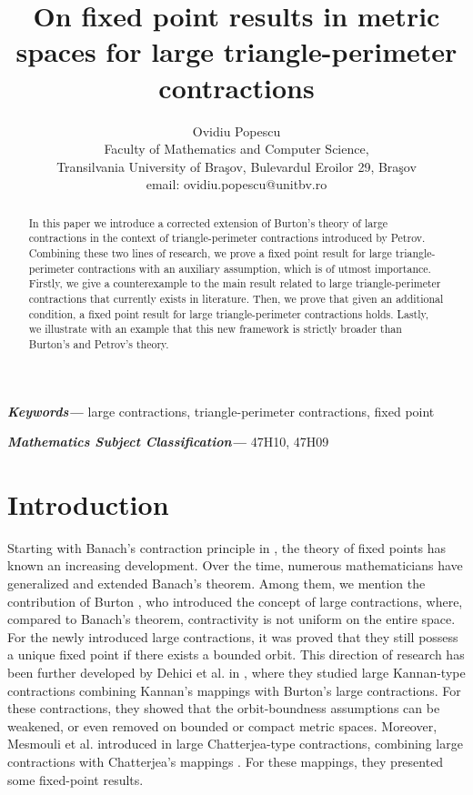 \documentclass[12 pt]{article}
\title{On fixed point results in metric spaces for large triangle-perimeter contractions}
\author{Ovidiu Popescu 
	\\ \small{Faculty of Mathematics and Computer Science,}\\ \small{Transilvania University of Bra\c sov, Bulevardul Eroilor 29, Bra\c sov}\\
	\small{email: {ovidiu.popescu@unitbv.ro}}}
\date{}
\theoremstyle{lema}
\theoremstyle{proposition}
\theoremstyle{theorem}
\theoremstyle{theorem}
\theoremstyle{corollary}
\theoremstyle{definition}
\theoremstyle{example}
\providecommand{\keywords}[1]
{
	\small	
	\textbf{\textit{Keywords---}} #1
}
\providecommand{\msc}[1]
{
	\small	
	\textbf{\textit{Mathematics Subject Classification---}} #1
}
\begin{document}
	
	\maketitle
	
	
	\begin{abstract}
		In this paper we introduce a corrected extension of Burton's theory of large contractions in the context of triangle-perimeter contractions introduced by Petrov. Combining these two lines of research, we prove a fixed point result for large triangle-perimeter contractions with an auxiliary assumption, which is of utmost importance. Firstly, we give a counterexample to the main result related to large triangle-perimeter contractions that currently exists in literature. Then, we prove that given an additional condition, a fixed point result for large triangle-perimeter contractions holds. Lastly, we illustrate with an example that this new framework is strictly broader than Burton's and Petrov's theory.
	\end{abstract}
	
	\keywords{large contractions, triangle-perimeter contractions, fixed point}
	
	\msc{47H10, 47H09}
	
	
	\section{Introduction}
	
	Starting with Banach's contraction principle in \cite{Banach}, the theory of fixed points has known an increasing development. Over the time, numerous mathematicians have generalized and extended Banach's theorem. Among them, we mention the contribution of Burton \cite{Burton2}, who introduced the concept of large contractions, where, compared to Banach's theorem, contractivity is not uniform on the entire space. For the newly introduced large contractions, it was proved that they still possess a unique fixed point if there exists a bounded orbit. This direction of research has been further developed by Dehici et al. in \cite{Dehici3}, where they studied large Kannan-type contractions combining Kannan's mappings \cite{Kannan} with Burton's large contractions. For these contractions, they showed that the orbit-boundness assumptions can be weakened, or even removed on bounded or compact metric spaces. Moreover, Mesmouli et al.  introduced in \cite{Mesmouli4} large Chatterjea-type contractions, combining large contractions with Chatterjea's mappings \cite{Chatterjea}. For these mappings, they presented some fixed-point results.
	
\end{document}
